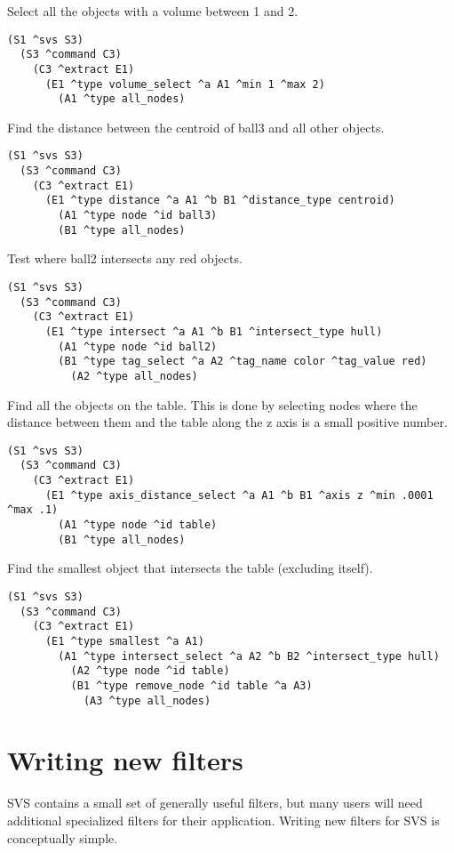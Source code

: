 Select all the objects with a volume between 1 and 2. 
\begin{verbatim}
(S1 ^svs S3)
  (S3 ^command C3)
    (C3 ^extract E1)
      (E1 ^type volume_select ^a A1 ^min 1 ^max 2)
        (A1 ^type all_nodes)
\end{verbatim} 

Find the distance between the centroid of ball3 and all other objects. 
\begin{verbatim}
(S1 ^svs S3)
  (S3 ^command C3)
    (C3 ^extract E1)
      (E1 ^type distance ^a A1 ^b B1 ^distance_type centroid)
        (A1 ^type node ^id ball3)
        (B1 ^type all_nodes)
\end{verbatim} 

Test where ball2 intersects any red objects. 
\begin{verbatim}
(S1 ^svs S3)
  (S3 ^command C3)
    (C3 ^extract E1)
      (E1 ^type intersect ^a A1 ^b B1 ^intersect_type hull)
        (A1 ^type node ^id ball2)
        (B1 ^type tag_select ^a A2 ^tag_name color ^tag_value red)
          (A2 ^type all_nodes)
\end{verbatim}

Find all the objects on the table. This is done by selecting nodes 
where the distance between them and the table along the z axis is a small positive number. 
\begin{verbatim}
(S1 ^svs S3)
  (S3 ^command C3)
    (C3 ^extract E1)
      (E1 ^type axis_distance_select ^a A1 ^b B1 ^axis z ^min .0001 ^max .1)
        (A1 ^type node ^id table)
        (B1 ^type all_nodes)
\end{verbatim}

Find the smallest object that intersects the table (excluding itself). 
\begin{verbatim}
(S1 ^svs S3)
  (S3 ^command C3)
    (C3 ^extract E1)
      (E1 ^type smallest ^a A1)
        (A1 ^type intersect_select ^a A2 ^b B2 ^intersect_type hull)
          (A2 ^type node ^id table)
          (B1 ^type remove_node ^id table ^a A3)
            (A3 ^type all_nodes)
\end{verbatim}




\section{Writing new filters}

SVS contains a small set of generally useful filters, but many users will need additional specialized filters for their application.
Writing new filters for SVS is conceptually simple.

